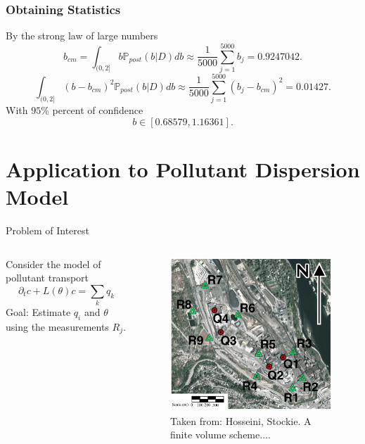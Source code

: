 \documentclass[11pt]{beamer}
\theoremstyle{plain}
\theoremstyle{definition}
\newcommand\ChangeFont{\fontsize{9}{7.2}\selectfont}
\newcommand{\p}{\mathbb{P}}
\newcommand{\post}{\p_{post}}
\begin{document}
\begin{frame}
\frametitle{Obtaining Statistics}
By the strong law of large numbers
\begin{equation*}
b_{cm}=\int_{(0,2]}b\post(b|D)db\approx\frac{1}{5000}
\sum_{j=1}^{5000}b_{j}=0.9247042.
\end{equation*}
\begin{equation*}
\int_{(0,2]}(b-b_{cm})^{2}\post(b|D)db\approx\frac{1}{5000}\sum_{j=1}^{5000}(b_{j}-b_{cm})^{2}=0.01427.
\end{equation*}
With $95\%$ percent of confidence
\begin{equation*}
b\in [0.68579,1.16361].
\end{equation*}
\end{frame}

\section{Application to Pollutant Dispersion Model}
\begin{frame}{Problem of Interest}

\begin{columns}[c]
\column{1.5in}
Consider the model of pollutant transport
\begin{equation*}
\partial_{t} c+L(\theta)c=\sum_{k}q_{k}
\end{equation*}
Goal: Estimate $q_{i}$ and $\theta$ using the measurements $R_{j}$.
\column{1.5in}
\begin{figure}
\includegraphics[scale=0.36]{BCtrail}
\ChangeFont
\caption{Taken from: Hosseini, Stockie. A finite volume scheme....}
\end{figure}

\end{columns}
\end{frame}
\end{document}
